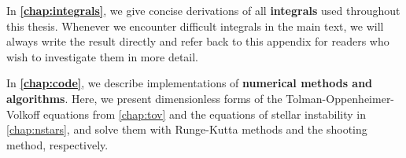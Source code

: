 In \textbf{\cref{chap:integrals}}, we give concise derivations of all \textbf{integrals} used throughout this thesis.
Whenever we encounter difficult integrals in the main text, we will always write the result directly and refer back to this appendix for readers who wish to investigate them in more detail.

In \textbf{\cref{chap:code}}, we describe implementations of \textbf{numerical methods and algorithms}.
Here, we present dimensionless forms of the Tolman-Oppenheimer-Volkoff equations from \cref{chap:tov} and the equations of stellar instability in \cref{chap:nstars}, and solve them with Runge-Kutta methods and the shooting method, respectively.
